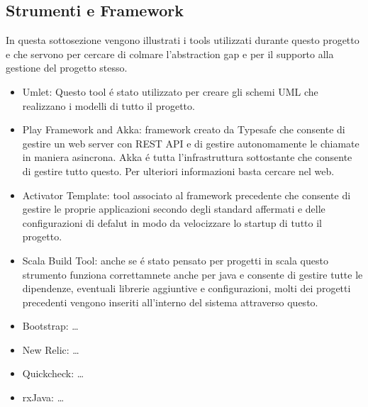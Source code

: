 \subsection{Strumenti e Framework}

In questa sottosezione vengono illustrati i tools utilizzati durante questo progetto e che servono per cercare di colmare l'abstraction gap e per il supporto alla gestione del progetto stesso.

\begin{itemize}
 \item{Umlet:} Questo tool \'e stato utilizzato per creare gli schemi UML che realizzano i modelli di tutto il progetto.
 \item {Play Framework and Akka:} framework creato da Typesafe che consente di gestire un web server con REST API e di gestire autonomamente le chiamate in maniera asincrona. Akka \'e tutta l'infrastruttura sottostante che consente di gestire tutto questo. Per ulteriori informazioni basta cercare nel web.
 \item {Activator Template:} tool associato al framework precedente che consente di gestire le proprie applicazioni secondo degli standard affermati e delle configurazioni di defalut in modo da velocizzare lo startup di tutto il progetto.
 \item {Scala Build Tool:} anche se \'e stato pensato per progetti in scala questo strumento funziona correttamnete anche per java e consente di gestire tutte le dipendenze, eventuali librerie aggiuntive e configurazioni, molti dei progetti precedenti vengono inseriti all'interno del sistema attraverso questo.
 \item {Bootstrap:} \ldots  
 \item {New Relic:} \ldots
 \item {Quickcheck:} \ldots
 \item {rxJava:} \ldots
\end{itemize}
